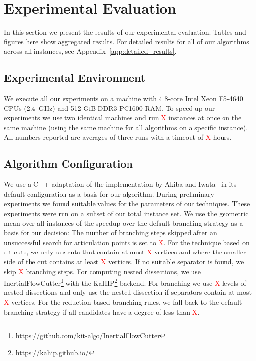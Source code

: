 \documentclass[a4paper,UKenglish,cleveref, autoref, thm-restate]{lipics-v2021}
\begin{document}

\section{Experimental Evaluation}

In this section we present the results of our experimental evaluation. Tables
and figures
here show aggregated results. For
detailed results for all of our algorithms across all instances, see Appendix~\ref{app:detailed_results}.

\subsection{Experimental Environment}
We execute all our experiments on a machine with 4 8-core Intel Xeon E5-4640 CPUs
(2.4~GHz) and 512 GiB DDR3-PC1600 RAM. To speed up our experiments we use two
identical machines and run \textcolor{red}{X} instances at once on the
same machine (using the same machine for all algorithms on a specific instance).
All numbers reported are averages  of three runs with
a timeout of \textcolor{red}{X} hours.

\subsection{Algorithm Configuration}
\label{sec:algo_conf}
We use a C++ adaptation of the implementation by Akiba and
Iwata~\cite{AkibaIwata} in its default configuration as a basis for our algorithm. During preliminary experiments we found
suitable values for the parameters of
our techniques. These experiments were run on a subset of our total instance
set. We use the geometric mean over all instances of the speedup over the
default branching strategy as a basis for our decision: The number of branching
steps skipped after an unsuccessful search for articulation points is set
to \textcolor{red}{X}. For the technique based on
s-t-cuts, we only use cuts that contain at most
\textcolor{red}{X} vertices and where the smaller side of
the cut contains at least \textcolor{red}{X} vertices.
If no suitable separator is found, we skip \textcolor{red}{X} branching steps. For computing nested dissections, we use 
InertialFlowCutter\footnote{\url{https://github.com/kit-algo/InertialFlowCutter}}
with the KaHIP\footnote{\url{https://kahip.github.io/}}
backend. For branching we use
\textcolor{red}{X} levels of nested dissections and
only use the nested dissection if separators contain at most
\textcolor{red}{X} vertices. For the reduction based
branching rules, we fall back to the default branching strategy if all
candidates have a degree of less than \textcolor{red}{X}.
\end{document}
